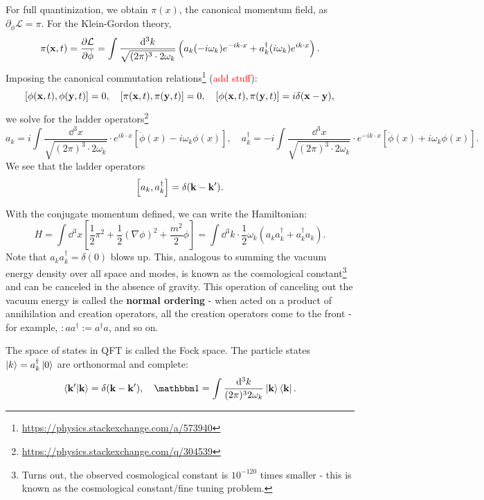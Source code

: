 \documentclass{article}
\begin{document}
For full quantinization, we obtain $\pi(x)$, the canonical momentum field, as $\partial_{\dot\phi}\mathcal L=\pi$. For the Klein-Gordon theory,
\begin{equation}
    \pi(\mathbf x,t)= \frac{\partial \mathcal L}{\partial \dot\phi}=\int\frac{\dd^3k}{\sqrt{(2\pi)^3\cdot 2\omega_k}}\left(a_k(-i\omega_k)e^{-ik\cdot x}+a^\dag_k(i\omega_k)e^{ik\cdot x}\right).
\end{equation}
Imposing the canonical commutation relations\footnote{\url{https://physics.stackexchange.com/a/573940}} (\textcolor{red}{add stuff}):
\begin{equation}
    \comm{\phi(\mathbf x,t)}{\phi(\mathbf y,t)}=0,\quad\comm{\pi(\mathbf x,t)}{\pi(\mathbf y,t)}=0,\quad\comm{\phi(\mathbf x,t)}{\pi(\mathbf y,t)}=i\delta(\mathbf x-\mathbf y),
\end{equation}
we solve for the ladder operators\footnote{\url{https://physics.stackexchange.com/q/304539}}
$$a_k=i\int\frac{\dd^3x}{\sqrt{(2\pi)^3\cdot 2\omega_k}}\cdot e^{ik\cdot x}\left[\dot\phi(x)-i\omega_k\phi(x)\right],\quad a^\dag_k=-i\int\frac{\dd^3x}{\sqrt{(2\pi)^3\cdot 2\omega_k}}\cdot e^{-ik\cdot x}\left[\dot\phi(x)+i\omega_k\phi(x)\right].$$
We see that the ladder operators 
\begin{equation}
    \comm{a_k}{a^\dag_k}=\delta(\mathbf k-\mathbf k').
\end{equation}

With the conjugate momentum defined, we can write the Hamiltonian:
$$H=\int\dd^3x\left[\frac 12\pi^2+\frac 12(\nabla\phi)^2+\frac{m^2}2\phi\right]=\int\dd^3k\cdot \frac 12\omega_k(a_ka^\dag_k+a^\dag_ka_k).$$
Note that $a_ka^\dag_k=\delta(0)$ blows up. This, analogous to summing the vacuum energy density over all space and modes, is known as the cosmological constant\footnote{Turns out, the observed cosmological constant is $10^{-120}$ times smaller - this is known as the cosmological constant/fine tuning problem.} and can be canceled in the absence of gravity. This operation of canceling out the vacuum energy is called the \textbf{normal ordering} - when acted on a product of annihilation and creation operators, all the creation operators come to the front - for example, $:aa^\dag:=a^\dag a$, and so on.

The space of states in QFT is called the Fock space. The particle states $\ket k=a^\dag_k\ket 0$ are orthonormal and complete:
$$\braket{\mathbf k'}{\mathbf k}=\delta(\mathbf k-\mathbf k'),\quad \mathbbm 1=\int\frac{\dd^3k}{(2\pi)^32\omega_k}\ket{\mathbf k}\bra{\mathbf k}.$$
\end{document}
